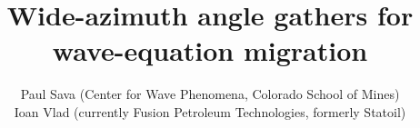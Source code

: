 


\title{Wide-azimuth angle gathers for wave-equation migration}
\author{
Paul Sava (Center for Wave Phenomena, Colorado School of Mines) \\
Ioan Vlad (currently Fusion Petroleum Technologies, formerly Statoil)
}
\maketitle















